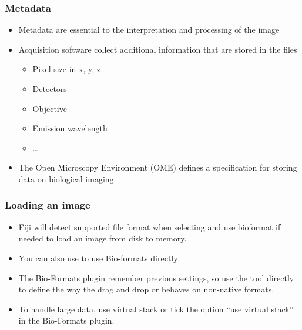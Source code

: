 \documentclass[ignorenonframetext,aspectratio=169,10pt,xcolor=table]{beamer}
\begin{document}
\begin{frame} \frametitle{Metadata}

  \begin {itemize} \setlength\itemsep{1em}
    \item Metadata are essential to the interpretation and processing of
      the image
    \item Acquisition software collect additional information that are
      stored in the files
    \begin{itemize}
      \item Pixel size in x, y, z
      \item Detectors
      \item Objective
      \item Emission wavelength
      \item \dots
     \end{itemize}
    \item The Open Microscopy Environment (OME) defines a specification
    for storing data on biological imaging.
  \end{itemize}


\end{frame}

\begin{frame} \frametitle{Loading an image}
  \begin{itemize} \setlength\itemsep{2em}
  \item Fiji will detect supported file format when selecting
     and use bioformat if needed to load an image from
    disk to memory.
  \item You can also use  to use Bio-formats directly
  \item The Bio-Formats plugin remember previous settings, so use
    the tool directly to define the way the drag and drop or
     behaves on non-native formats.
  \item To handle large data, use virtual stack  or tick the option ``use virtual stack'' in the Bio-Formats plugin.
  \end{itemize}
\end{frame}
\end{document}
